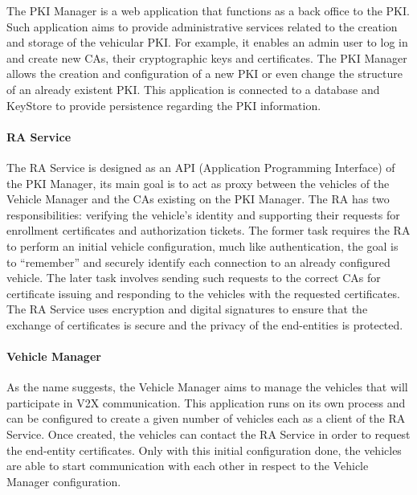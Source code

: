 The PKI Manager is a web application that functions as a back office to the PKI. Such application aims to provide administrative services related to the creation and storage of the vehicular PKI. For example, it enables an admin user to log in and create new CAs, their cryptographic keys and certificates. The PKI Manager allows the creation and configuration of a new PKI or even change the structure of an already existent PKI. This application is connected to a database and KeyStore to provide persistence regarding the PKI information.


\paragraph{RA Service}
\label{section:model}

The RA Service is designed as an API (Application Programming Interface) of the PKI Manager, its main goal is to act as proxy between the vehicles of the Vehicle Manager and the CAs existing on the PKI Manager. The RA has two responsibilities: verifying the vehicle's identity and supporting their requests for enrollment certificates and authorization tickets. The former task requires the RA to perform an initial vehicle configuration, much like authentication, the goal is to “remember” and securely identify each connection to an already configured vehicle. The later task involves sending such requests to the correct CAs for certificate issuing and responding to the vehicles with the requested certificates. The RA Service uses encryption and digital signatures to ensure that the exchange of certificates is secure and the privacy of the end-entities is protected.

\paragraph{Vehicle Manager}
\label{section:model}
As the name suggests, the Vehicle Manager aims to manage the vehicles that will participate in V2X communication. This application runs on its own process and can be configured to create a given number of vehicles each as a client of the RA Service. Once created, the vehicles can contact the RA Service in order to request the end-entity certificates. Only with this initial configuration done, the vehicles are able to start communication with each other in respect to the Vehicle Manager configuration.

